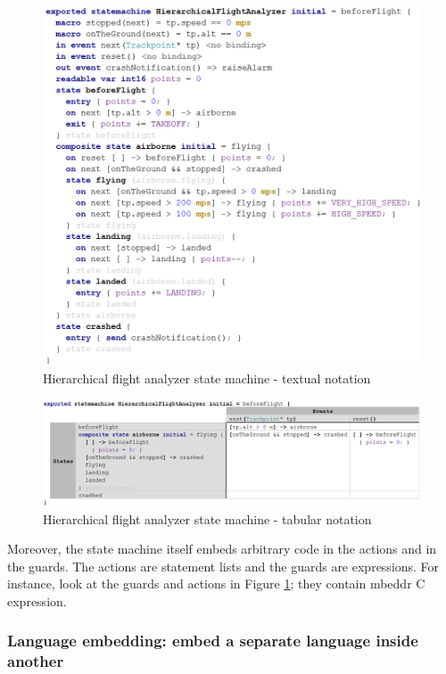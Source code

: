\documentclass[preprint,numbers,10pt]{sigplanconf}
\begin{document}
\begin{figure}[ht!]
	\centering
	\includegraphics[scale=0.5]{screens/HierarchicalFlightAnalyzerT}
	\caption{Hierarchical flight analyzer state machine - textual notation}
	\label{fig:HFAT}
\end{figure}

\begin{figure}[ht!]
	\centering
	\includegraphics[scale=0.55]{screens/HierarchicalFlightAnalyzerTab}
	\caption{Hierarchical flight analyzer state machine - tabular notation}
	\label{fig:HFATab}
\end{figure}

Moreover, the state machine itself embeds arbitrary code in the actions
and in the guards. The actions are statement lists and the guards are expressions.
For instance, look at the guards and actions in Figure \ref{fig:HFAT}; they contain mbeddr C expression.

\subsubsection{Language embedding: embed a separate language inside another}
\end{document}
